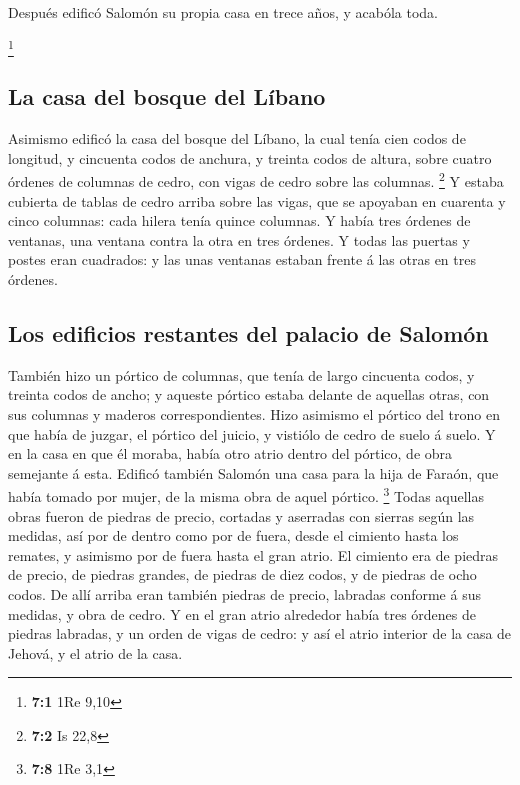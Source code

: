  Después edificó Salomón su propia casa en trece años, y
acabóla toda.

\footnote{\textbf{7:1} 1Re 9,10}

\hypertarget{la-casa-del-bosque-del-luxedbano}{%
\subsection{La casa del bosque del
Líbano}\label{la-casa-del-bosque-del-luxedbano}}

 Asimismo edificó la casa del bosque del Líbano, la cual
tenía cien codos de longitud, y cincuenta codos de anchura, y treinta
codos de altura, sobre cuatro órdenes de columnas de cedro, con vigas de
cedro sobre las columnas. \footnote{\textbf{7:2} Is 22,8} 
Y estaba cubierta de tablas de cedro arriba sobre las vigas, que se
apoyaban en cuarenta y cinco columnas: cada hilera tenía quince
columnas.  Y había tres órdenes de ventanas, una ventana
contra la otra en tres órdenes.  Y todas las puertas y
postes eran cuadrados: y las unas ventanas estaban frente á las otras en
tres órdenes.

\hypertarget{los-edificios-restantes-del-palacio-de-salomuxf3n}{%
\subsection{Los edificios restantes del palacio de
Salomón}\label{los-edificios-restantes-del-palacio-de-salomuxf3n}}

 También hizo un pórtico de columnas, que tenía de largo
cincuenta codos, y treinta codos de ancho; y aqueste pórtico estaba
delante de aquellas otras, con sus columnas y maderos correspondientes.
 Hizo asimismo el pórtico del trono en que había de
juzgar, el pórtico del juicio, y vistiólo de cedro de suelo á suelo.
 Y en la casa en que él moraba, había otro atrio dentro
del pórtico, de obra semejante á esta. Edificó también Salomón una casa
para la hija de Faraón, que había tomado por mujer, de la misma obra de
aquel pórtico. \footnote{\textbf{7:8} 1Re 3,1}  Todas
aquellas obras fueron de piedras de precio, cortadas y aserradas con
sierras según las medidas, así por de dentro como por de fuera, desde el
cimiento hasta los remates, y asimismo por de fuera hasta el gran atrio.
 El cimiento era de piedras de precio, de piedras
grandes, de piedras de diez codos, y de piedras de ocho codos.
 De allí arriba eran también piedras de precio, labradas
conforme á sus medidas, y obra de cedro.  Y en el gran
atrio alrededor había tres órdenes de piedras labradas, y un orden de
vigas de cedro: y así el atrio interior de la casa de Jehová, y el atrio
de la casa.

